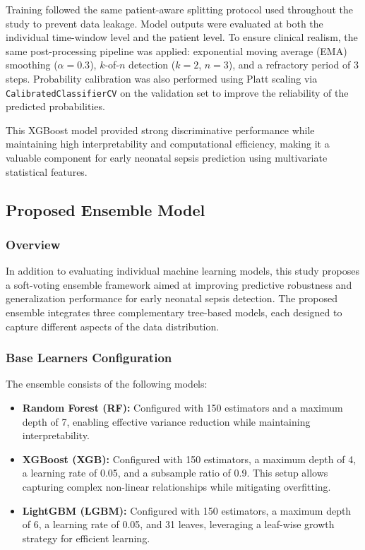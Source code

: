 \documentclass[conference]{IEEEtran}
\begin{document}
Training followed the same patient-aware splitting protocol used throughout the study to prevent data leakage. Model outputs were evaluated at both the individual time-window level and the patient level. To ensure clinical realism, the same post-processing pipeline was applied: exponential moving average (EMA) smoothing ($\alpha = 0.3$), $k$-of-$n$ detection ($k=2$, $n=3$), and a refractory period of 3 steps. Probability calibration was also performed using Platt scaling via \texttt{CalibratedClassifierCV} on the validation set to improve the reliability of the predicted probabilities.

This XGBoost model provided strong discriminative performance while maintaining high interpretability and computational efficiency, making it a valuable component for early neonatal sepsis prediction using multivariate statistical features.




\subsection{Proposed Ensemble Model}

\subsubsection{Overview}
In addition to evaluating individual machine learning models, this study proposes a soft-voting ensemble framework aimed at improving predictive robustness and generalization performance for early neonatal sepsis detection. The proposed ensemble integrates three complementary tree-based models, each designed to capture different aspects of the data distribution.

\subsubsection{Base Learners Configuration}
The ensemble consists of the following models:

\begin{itemize}
    \item \textbf{Random Forest (RF):} Configured with 150 estimators and a maximum depth of 7, enabling effective variance reduction while maintaining interpretability.
    
    \item \textbf{XGBoost (XGB):} Configured with 150 estimators, a maximum depth of 4, a learning rate of 0.05, and a subsample ratio of 0.9. This setup allows capturing complex non-linear relationships while mitigating overfitting.
    
    \item \textbf{LightGBM (LGBM):} Configured with 150 estimators, a maximum depth of 6, a learning rate of 0.05, and 31 leaves, leveraging a leaf-wise growth strategy for efficient learning.
\end{itemize}
\end{document}
